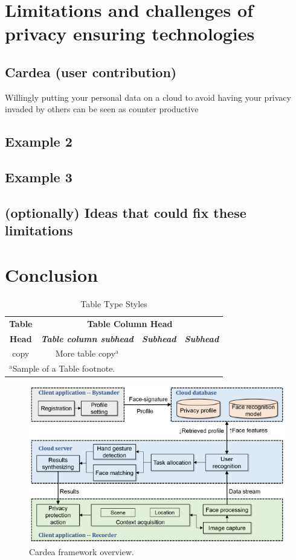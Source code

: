 \documentclass[conference]{ieeetran}
\begin{document}
\section{Limitations and challenges of privacy ensuring technologies}\label{Limitations}
\subsection{Cardea (user contribution)}
Willingly putting your personal data on a cloud to avoid having your privacy invaded by others can be seen as counter productive
\subsection{Example 2}
\subsection{Example 3}
\subsection{(optionally) Ideas that could fix these limitations}

\section{Conclusion}\label{Conclusion}


\begin{table}[htbp]
\caption{Table Type Styles}
\begin{center}
\begin{tabular}{|c|c|c|c|}
\hline
\textbf{Table}&\multicolumn{3}{|c|}{\textbf{Table Column Head}} \\
\cline{2-4} 
\textbf{Head} & \textbf{\textit{Table column subhead}}& \textbf{\textit{Subhead}}& \textbf{\textit{Subhead}} \\
\hline
copy& More table copy$^{\mathrm{a}}$& &  \\
\hline
\multicolumn{4}{l}{$^{\mathrm{a}}$Sample of a Table footnote.}
\end{tabular}
\label{tab1}
\end{center}
\end{table}

\begin{figure}[t]
\centerline{\includegraphics[width=.5\textwidth]{img/cardea_overview_diagram.png}}
\caption{Cardea framework overview.}
\label{fig}
\end{figure}
\end{document}

